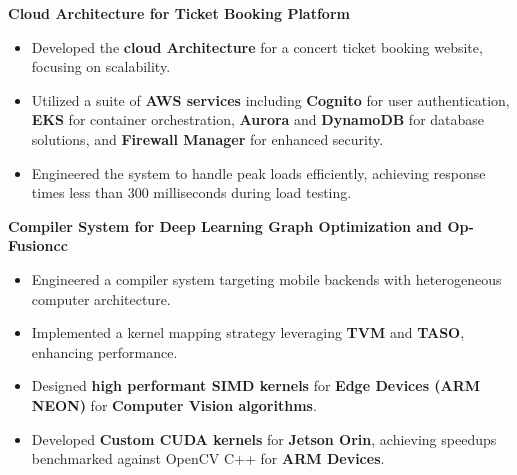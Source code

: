 \documentclass[10pt,a4]{article}
\begin{document}
{\begin{flushleft}
\begin{itemize}
        \end{itemize}
    \vspace{0.5mm}
    \item \textbf{\large Cloud Architecture for Ticket Booking Platform}
        \vspace{0.5mm}
        \begin{itemize}
            \item Developed the \textbf{cloud Architecture} for a concert ticket booking website, focusing on scalability.
            \item Utilized a suite of \textbf{AWS services} including \textbf{Cognito} for user authentication, \textbf{EKS} for container orchestration, \textbf{Aurora} and \textbf{DynamoDB} for database solutions, and \textbf{Firewall Manager} for enhanced security.
            \item Engineered the system to handle peak loads efficiently, achieving response times less than 300 milliseconds during load testing.
        \end{itemize}

    \vspace{0.5mm}
    \item \textbf{\large Compiler System for Deep Learning Graph Optimization and Op-Fusioncc}
        \vspace{0.5mm}
        \begin{itemize}
            \item Engineered a compiler system targeting mobile backends with heterogeneous computer architecture.
            \item Implemented a kernel mapping strategy leveraging \textbf{TVM} and \textbf{TASO}, enhancing performance.
            \item Designed \textbf{high performant SIMD kernels} for \textbf{Edge Devices (ARM NEON)} for \textbf{Computer Vision algorithms}.
            \item Developed \textbf{Custom CUDA kernels} for \textbf{Jetson Orin}, achieving speedups benchmarked against OpenCV C++ for \textbf{ARM Devices}.
        \end{itemize}

\end{flushleft}

}
	
\end{document}
